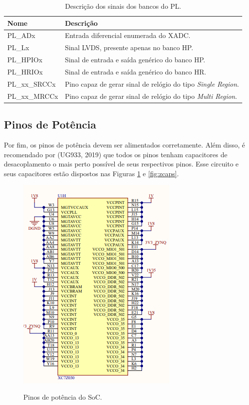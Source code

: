 \begin{table}[H]
	\ABNTEXfontereduzida
	\caption{\label{tab:plzynq}Descrição dos sinais dos bancos do PL.}
    \centering
    \begin{tabular}{@{} >{\centering}p{4cm} >{\centering}p{8cm} @{}}
    
		\toprule
		\textbf{Nome} & \textbf{Descrição} \tabularnewline 
        \midrule
         PL\_ADx & Entrada diferencial enumerada do XADC. \tabularnewline
        \midrule
         PL\_Lx & Sinal LVDS, presente apenas no banco HP. \tabularnewline
        \midrule
         PL\_HPIOx & Sinal de entrada e saída genérico do banco HP.  \tabularnewline
        \midrule
        PL\_HRIOx  & Sinal de entrada e saída genérico do banco HR. \tabularnewline
        \midrule
        PL\_xx\_SRCCx & Pino capaz de gerar sinal de relógio do tipo \textit{Single Region}. \tabularnewline
        \midrule
        PL\_xx\_MRCCx & Pino capaz de gerar sinal de relógio do tipo \textit{Multi Region}. \tabularnewline
        \bottomrule
	\end{tabular}
\end{table}

\subsection{Pinos de Potência}

Por fim, os pinos de potência devem ser alimentados corretamente. Além disso, é recomendado por (UG933, 2019) que todos os pinos tenham capacitores de desacoplamento o mais perto possível de seus respectivos pinos. Esse circuito e seus capacitores estão dispostos nas Figuras \ref{fig:zpower} e \ref{fig:zcaps}.

\begin{figure}[H]
    \centering
    \caption{Pinos de potência do SoC.}
    \includegraphics[scale=0.7]{images/zynqpower.png}
    \label{fig:zpower}
\end{figure}

